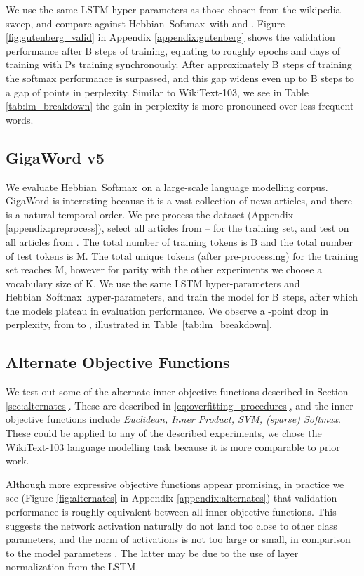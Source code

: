 \documentclass{article} \usepackage{hyperref}
\newcommand{\model}{\hbox{Hebbian Softmax }}
\begin{document}
We use the same LSTM hyper-parameters as those chosen from the wikipedia sweep, and compare against \model with  and . Figure \ref{fig:gutenberg_valid} in Appendix \ref{appendix:gutenberg} shows the validation performance after B steps of training, equating to roughly  epochs and  days of training with  Ps training synchronously. After approximately B steps of training the softmax performance is surpassed, and this gap widens even up to B steps to a gap of  points in perplexity. Similar to WikiText-103, we see in Table \ref{tab:lm_breakdown} the gain in perplexity is more pronounced over less frequent words.


\subsection{GigaWord v5}
We evaluate \model on a large-scale language modelling corpus. GigaWord is interesting because it is a vast collection of news articles, and there is a natural temporal order. We pre-process the dataset (Appendix \ref{appendix:preprocess}), select all articles from -- for the training set, and test on all articles from . The total number of training tokens is B and the total number of test tokens is M. The total unique tokens (after pre-processing) for the training set reaches M, however for parity with the other experiments we choose a vocabulary size of K. We use the same LSTM hyper-parameters and \model hyper-parameters, and train the model for B steps, after which the models plateau in evaluation performance. We observe a -point drop in perplexity, from  to , illustrated in Table~\ref{tab:lm_breakdown}. 

\subsection{Alternate Objective Functions}
We test out some of the alternate inner objective functions described in Section \ref{sec:alternates}. These are described in \eqref{eq:overfitting_procedures}, and  the inner objective functions include \textit{Euclidean, Inner Product, SVM, (sparse) Softmax}. These could be applied to any of the described experiments, we chose the WikiText-103 language modelling task because it is more comparable to prior work.

Although more expressive objective functions appear promising, in practice we see (Figure \ref{fig:alternates} in Appendix \ref{appendix:alternates}) that validation performance is roughly equivalent between all inner objective functions. This suggests the network activation  naturally do not land too close to other class parameters, and the norm of activations is not too large or small, in comparison to the model parameters . The latter may be due to the use of layer normalization from the LSTM.
\end{document}

